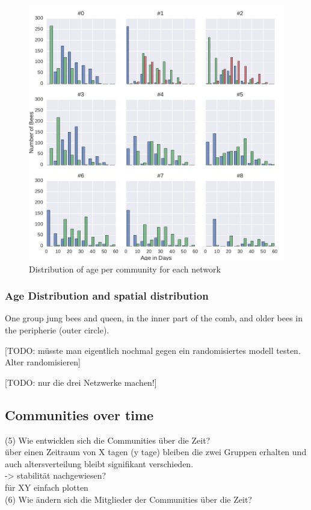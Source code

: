 \begin{figure}[htb]
	\centering
	\includegraphics[width=1.0\textwidth]{Figures/ageDistribution}
	\caption{Distribution of age per community for each network}
	\label{fig:ageDist}
\end{figure}


\subsubsection{Age Distribution and spatial distribution}
One group jung bees and queen, in the inner part of the comb, and older bees in the peripherie (outer circle).

[TODO: müsste man eigentlich nochmal gegen ein randomisiertes modell testen. Alter randomisieren]

[TODO: nur die drei Netzwerke machen!]

\subsection{Communities over time}
(5) Wie entwicklen sich die Communities über die Zeit?\\
über einen Zeitraum von X tagen (y tage) bleiben die zwei Gruppen erhalten und auch altersverteilung bleibt signifikant verschieden.\\
-> stabilität nachgewiesen?\\
für XY einfach plotten\\

(6) Wie ändern sich die Mitglieder der Communities über die Zeit?\\